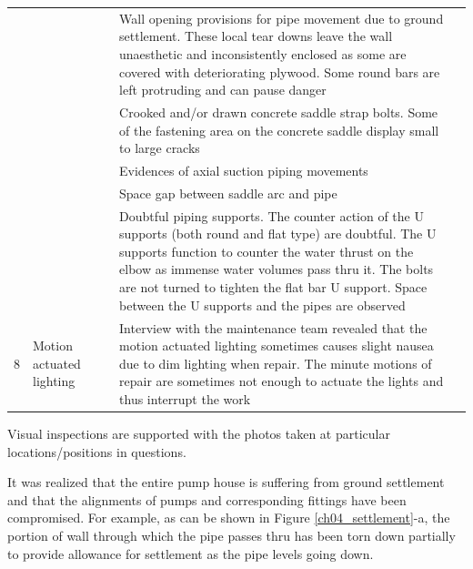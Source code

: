 \begin{table}[!htb]
{\begin{tabular}{c|p{2cm}|c|p{9.5cm}|l}
	&  &  & Wall opening provisions for pipe movement due to ground settlement. These local tear downs leave the wall unaesthetic and inconsistently enclosed as some are covered with deteriorating plywood. Some round bars are left protruding and can pause danger &  \\ 
	&  &  & Crooked and/or drawn concrete saddle strap bolts. Some of the fastening area on the concrete saddle display small to large cracks &  \\ 
	&  &  & Evidences of axial suction piping movements &  \\ 
	&  &  & Space gap between saddle arc and pipe &  \\ 
	&  &  & Doubtful piping supports. The counter action of the U supports (both round and flat type) are doubtful. The U supports function to counter the water thrust on the elbow as immense water volumes pass thru it. The bolts are not turned to tighten the flat bar U support. Space between the U supports and the pipes are observed &  \\ 
	8 & Motion actuated lighting &  & Interview with the maintenance team revealed that the motion actuated lighting sometimes causes slight nausea due to dim lighting when repair. The minute motions of repair are sometimes not enough to actuate the lights and thus interrupt the work &  \\ 
	\hline
\end{tabular}
	}%
\end{table}

Visual inspections are supported with the photos taken at particular locations/positions in questions.

It was realized that the entire pump house is suffering from ground settlement and that the alignments of pumps and corresponding fittings have been compromised. For example, as can be shown in Figure \ref{ch04_settlement}-a, the portion of wall through which the pipe passes thru has been torn down partially to provide allowance for settlement as the pipe levels going down.

